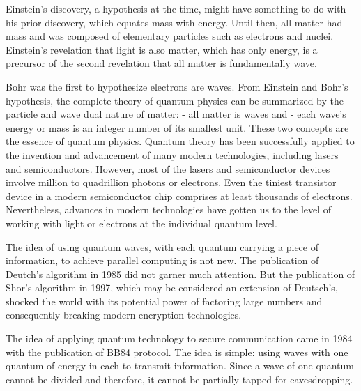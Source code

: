 \documentclass[oneside, letter, 12pt]{book}
\begin{document}
Einstein's discovery, a hypothesis at the time, might have something to do with his prior discovery, which equates mass with energy. Until then, all matter had mass and was composed of elementary particles such as electrons and nuclei. Einstein's revelation that light is also matter, which has only energy, is a precursor of the second revelation that all matter is fundamentally wave.

Bohr was the first to hypothesize electrons are waves. From Einstein and Bohr's hypothesis, the complete theory of quantum physics can be summarized by the particle and wave dual nature of matter:
- all matter is waves and
- each wave's energy or mass is an integer number of its smallest unit.
These two concepts are the essence of quantum physics. Quantum theory has been successfully applied to the invention and advancement of many modern technologies, including lasers and semiconductors. However, most of the lasers and semiconductor devices involve million to quadrillion photons or electrons. Even the tiniest transistor device in a modern semiconductor chip comprises at least thousands of electrons. Nevertheless, advances in modern technologies have gotten us to the level of working with light or electrons at the individual quantum level.

The idea of using quantum waves, with each quantum carrying a piece of information, to achieve parallel computing is not new. The publication of Deutch's algorithm\cite{1985Deutsch} in 1985 did not garner much attention. But the publication of Shor's algorithm in 1997, which may be considered an extension of Deutsch's, shocked the world with its potential power of factoring large numbers and consequently breaking modern encryption technologies.

The idea of applying quantum technology to secure communication came in 1984 with the publication of BB84 protocol\cite{BB84}. The idea is simple: using waves with one quantum of energy in each to transmit information. Since a wave of one quantum cannot be divided and therefore, it cannot be partially tapped for eavesdropping.
\end{document}
